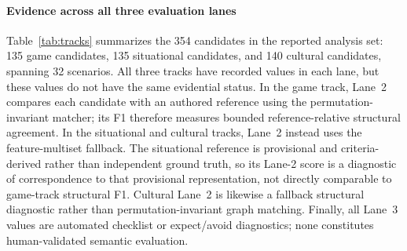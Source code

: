 \documentclass{article}
\begin{document}
\begin{table}[H]
\centering
\small
\caption{Completed evidence by track and evaluation lane. Game Lane 2 uses permutation-invariant matching against an authored reference; Situational and Cultural Lane 2 both retain the feature-multiset fallback backend. The situational Lane-2 reference is provisional and criteria-derived rather than independent ground truth, so its score is diagnostic and is not comparable in kind to the game figure. Lane-3 values are automated diagnostics, not human-validated judgments.}
\label{tab:tracks}
\vspace{1mm}

\end{table}

\paragraph{Evidence across all three evaluation lanes}
  Table~\ref{tab:tracks} summarizes the 354 candidates in the reported analysis
  set: 135 game candidates, 135 situational candidates, and 140 cultural
  candidates, spanning 32 scenarios. All three tracks have recorded values in
  each lane, but these values do not have the same evidential status. In the
  game track, Lane~2 compares each candidate with an authored reference using
  the permutation-invariant matcher; its F1 therefore measures bounded
  reference-relative structural agreement. In the situational and cultural
  tracks, Lane~2 instead uses the feature-multiset fallback. The situational
  reference is provisional and criteria-derived rather than independent ground
  truth, so its Lane-2 score is a diagnostic of correspondence to that
  provisional representation, not directly comparable to game-track structural
  F1. Cultural Lane~2 is likewise a fallback structural diagnostic rather than
  permutation-invariant graph matching. Finally, all Lane~3 values are
  automated checklist or expect/avoid diagnostics; none constitutes
  human-validated semantic evaluation.
\end{document}
